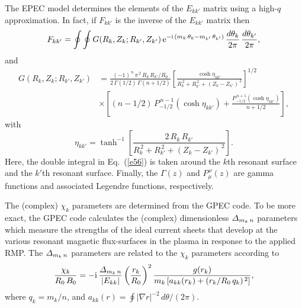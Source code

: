 \documentclass[12pt,prb,aps]{revtex4-1}
\begin{document}
The EPEC model determines the elements of the $E_{kk'}$ matrix using a high-$q$ approximation. In fact, if $F_{kk'}$ is the inverse of the $E_{kk'}$ matrix then\,\cite{rftor}
\begin{equation}\label{e56}
F_{kk'} = \oint\oint 
G(R_k,Z_k;R_{k'},Z_{k'})\,{\rm e}^{-{\rm i}\,(m_k\,\theta_k-m_{k'}\,\theta_{k'})}\,\frac{d\theta_k}{2\pi}\,\frac{d\theta_{k'}}{2\pi},
\end{equation}
and
\begin{align}
 G(R_k,Z_k;R_{k'},Z_{k'})&= \frac{(-1)^{\,n}\,\pi^{\,2}\,R_k\,R_{k'}/R_0}{2\,{\Gamma}(1/2)\,{\Gamma}(n+1/2)}
\left[\frac{\cosh\eta_{kk'}}{R_k^{\,2}+R_{k'}^{\,2}+(Z_k-Z_{k'})^{\,2}}\right]^{1/2}\nonumber\\[0.5ex]
&\times\left[(n-1/2)\,P_{-1/2}^{\,n-1}(\cosh\eta_{kk'})+
\frac{P_{-1/2}^{\,n+1}(\cosh\eta_{kk'})}{n+1/2}\right],
\end{align}
with
\begin{equation}
\eta_{kk'} = \tanh^{-1}\left[\frac{2\,R_k\,R_{k'}}{R_k^{\,2}+R_{k'}^{\,2}+(Z_k-Z_{k'})^{\,2}}\right].
\end{equation}
Here, the double integral in Eq.~(\ref{e56}) is taken around the
$k$th resonant surface and the $k'$th resonant surface. Finally, the ${\Gamma}(z)$ and $P_\mu^{\,\nu}(z)$ are gamma functions and associated Legendre functions, respectively.

The (complex) $\chi_k$ parameters are determined from the GPEC code.\cite{gpec}
To be more exact, the GPEC code calculates the (complex) dimensionless ${\mit\Delta}_{m_k\,n}$ parameters which measure the strengths of the ideal current sheets that develop
at the various resonant magnetic flux-surfaces in the plasma in response to the applied RMP.  The ${\mit\Delta}_{m_k\,n}$ parameters are related to the $\chi_k$ parameters according to
\begin{equation}\label{a8}
\frac{\chi_k}{R_0\,B_0} = -{\rm i} \,\frac{{\mit\Delta}_{m_k\,n}}{|E_{kk}|}\left(\frac{r_k}{R_0}\right)^2
\frac{g(r_k)}{m_k\,[a_{kk}(r_k)+ (r_k/R_0\,q_k)^{\,2}]},
\end{equation}
where $q_k= m_k/n$, and $a_{kk}(r) = \oint |\nabla r|^{-2}\,d\theta/(2\pi)$. 
\end{document}
